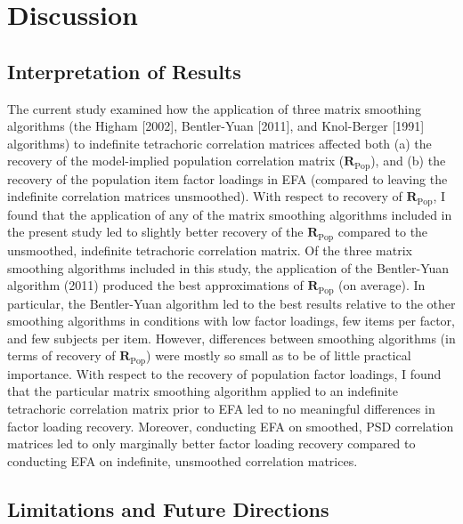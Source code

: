\documentclass[
  english,
  man]{apa6}
\begin{document}
\hypertarget{discussion}{%
\section{Discussion}\label{discussion}}

\hypertarget{interpretation-of-results}{%
\subsection{Interpretation of Results}\label{interpretation-of-results}}

The current study examined how the application of three matrix smoothing algorithms (the Higham {[}2002{]}, Bentler-Yuan {[}2011{]}, and Knol-Berger {[}1991{]} algorithms) to indefinite tetrachoric correlation matrices affected both (a) the recovery of the model-implied population correlation matrix (\(\mathbf{R}_{\textrm{Pop}}\)), and (b) the recovery of the population item factor loadings in EFA (compared to leaving the indefinite correlation matrices unsmoothed). With respect to recovery of \(\mathbf{R}_{\textrm{Pop}}\), I found that the application of any of the matrix smoothing algorithms included in the present study led to slightly better recovery of the \(\mathbf{R}_{\textrm{Pop}}\) compared to the unsmoothed, indefinite tetrachoric correlation matrix. Of the three matrix smoothing algorithms included in this study, the application of the Bentler-Yuan algorithm (2011) produced the best approximations of \(\mathbf{R}_{\textrm{Pop}}\) (on average). In particular, the Bentler-Yuan algorithm led to the best results relative to the other smoothing algorithms in conditions with low factor loadings, few items per factor, and few subjects per item. However, differences between smoothing algorithms (in terms of recovery of \(\mathbf{R}_{\textrm{Pop}}\)) were mostly so small as to be of little practical importance. With respect to the recovery of population factor loadings, I found that the particular matrix smoothing algorithm applied to an indefinite tetrachoric correlation matrix prior to EFA led to no meaningful differences in factor loading recovery. Moreover, conducting EFA on smoothed, PSD correlation matrices led to only marginally better factor loading recovery compared to conducting EFA on indefinite, unsmoothed correlation matrices.

\hypertarget{limitations-and-future-directions}{%
\subsection{Limitations and Future Directions}\label{limitations-and-future-directions}}
\end{document}
